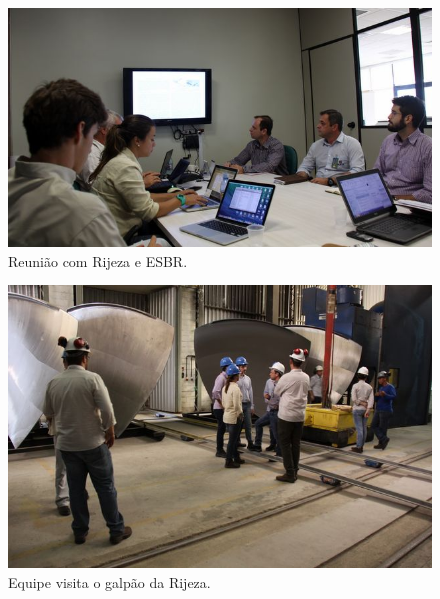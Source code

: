 \documentclass[a4paper,11pt,oneside,openany,brazilian,version=last,draft=false,]{main}
\begin{document}
\begin{twocolumn}
\begin{figure}[H]
\centering
\includegraphics[width=\columnwidth]{Fotos/img_4836.jpg}
\caption{Reunião com Rijeza e ESBR.}
\label{fig:gull}
\end{figure}
\begin{figure}[H]
\centering
\includegraphics[width=\columnwidth]{Fotos/img_4881.jpg}
\caption{Equipe visita o galpão da Rijeza.}
\label{fig:tiger}
\end{figure}



\end{twocolumn}
\end{document}
